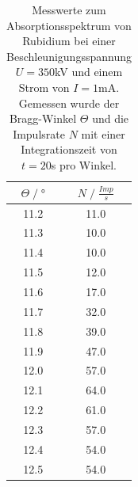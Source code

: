 \begin{table}[H]
    \centering
    \begin{tabular}{c c}
        \toprule
        $\Theta\;/\;°$& $N\;/\;\frac{Imp}{s}$\\
        \midrule
        11.2&    11.0\\
        11.3&    10.0\\
        11.4&    10.0\\
        11.5&    12.0\\
        11.6&    17.0\\
        11.7&    32.0\\
        11.8&    39.0\\
        11.9&    47.0\\
        12.0&    57.0\\
        12.1&    64.0\\
        12.2&    61.0\\
        12.3&    57.0\\
        12.4&    54.0\\
        12.5&    54.0\\
        \bottomrule
    \end{tabular}
    \caption{Messwerte zum Absorptionsspektrum von Rubidium bei einer Beschleunigungsspannung 
    $U=350$kV und einem Strom von $I=1$mA.\\
    Gemessen wurde der Bragg-Winkel $\Theta$ und die Impulsrate $N$ mit einer Integrationszeit
    von $t=20$s pro Winkel.}
\end{table}

\label{sec:anhang}